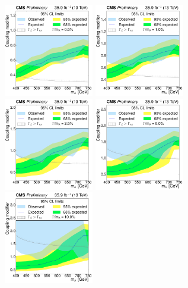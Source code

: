 \begin{figure}[!Hhtb]
\centering
\includegraphics[width=0.35\textwidth,keepaspectratio=true]{fig/chapt8/limits/limit_A_0p5.pdf}
\includegraphics[width=0.35\textwidth,keepaspectratio=true]{fig/chapt8/limits/limit_A_1.pdf}
\includegraphics[width=0.35\textwidth,keepaspectratio=true]{fig/chapt8/limits/limit_A_2p5.pdf}
\includegraphics[width=0.35\textwidth,keepaspectratio=true]{fig/chapt8/limits/limit_A_5.pdf}
\includegraphics[width=0.35\textwidth,keepaspectratio=true]{fig/chapt8/limits/limit_A_10.pdf}

\end{figure}

